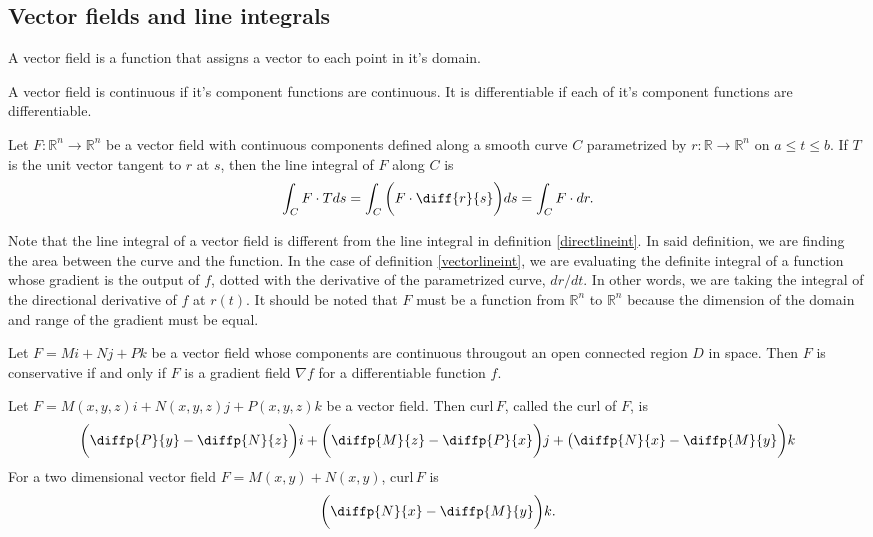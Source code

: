 \documentclass[oneside]{book}
\begin{document}
\subsection{Vector fields and line integrals}
\begin{definition}
	A vector field is a function that assigns a vector to each point in it's domain.
\end{definition}
\begin{proposition}
	A vector field is continuous if it's component functions are continuous. It is differentiable if each of it's component functions are differentiable.
\end{proposition}
\begin{definition}
	\label{vectorlineint}
	Let \(F:\mathbb{R}^n\rightarrow\mathbb{R}^n\) be a vector field with continuous components defined along a smooth curve \(C\) parametrized by \(r:\mathbb{R}\rightarrow\mathbb{R}^n\) on \(a\leq t\leq b\). If \(T\) is the unit vector tangent to \(r\) at \(s\), then the line integral of \(F\) along \(C\) is
	\begin{equation*}
		\int_C F\cdot Tds=\int_C\bigg(F\cdot\diff{r}{s}\bigg)ds=\int_CF\cdot dr.
	\end{equation*}
\end{definition}
\begin{remark}
	Note that the line integral of a vector field is different from the line integral in definition \ref{directlineint}. In said definition, we are finding the area between the curve and the function. In the case of definition \ref{vectorlineint}, we are evaluating the definite integral of a function whose gradient is the output of \(f\), dotted with the derivative of the parametrized curve, \(dr/dt\). In other words, we are taking the integral of the directional derivative of \(f\) at \(r(t)\). It should be noted that \(F\) must be a function from \(\mathbb{R}^n\) to \(\mathbb{R}^n\) because the dimension of the domain and range of the gradient must be equal.
\end{remark}
\begin{theorem}
	Let \(F=Mi+Nj+Pk\) be a vector field whose components are continuous througout an open connected region \(D\) in space. Then \(F\) is conservative if and only if \(F\) is a gradient field \(\nabla f\) for a differentiable function \(f\).
\end{theorem}
\begin{definition}[Curl]
	Let \(F=M(x,y,z)i+N(x,y,z)j+P(x,y,z)k\) be a vector field. Then \(\text{curl}\,F\), called the curl of \(F\), is
	\begin{equation*}
		\bigg(\diffp{P}{y}-\diffp{N}{z}\bigg)i+\bigg(\diffp{M}{z}-\diffp{P}{x}\bigg)j+\big(\diffp{N}{x}-\diffp{M}{y}\bigg)k
	\end{equation*}
	For a two dimensional vector field \(F=M(x,y)+N(x,y)\), \(\text{curl}\,F\) is
	\begin{equation*}
		\bigg(\diffp{N}{x}-\diffp{M}{y}\bigg)k.
	\end{equation*}
\end{definition}
\end{document}

